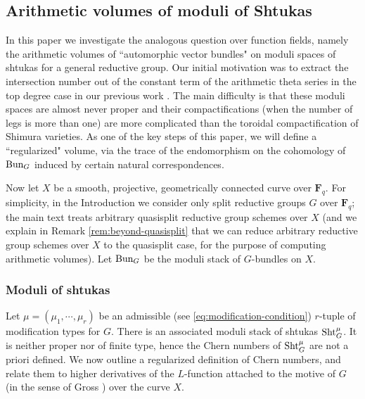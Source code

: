 \documentclass[reqno]{amsart}
\numberwithin{equation}{subsection}
\theoremstyle{definition}
\newcommand{\Bun}{\textup{Bun}}
\newcommand\Sht{\textup{Sht}}
\newcommand{\F}{\mathbf{F}}
\begin{document}
\subsection{Arithmetic volumes of moduli of Shtukas}


In this paper we investigate the analogous question over function fields, namely the arithmetic volumes of ``automorphic vector bundles" on moduli spaces of shtukas for a general reductive group. Our initial motivation was to extract the intersection number out of the constant term of the arithmetic theta series in  the top degree case in our previous work \cite{FYZ2}. The main difficulty is that these moduli spaces are almost never proper and their compactifications (when the number of legs is more than one) are more complicated than the toroidal compactification of Shimura varieties. As one of the key steps of this paper, we will define a ``regularized" volume, via the trace of the endomorphism on the cohomology of $\Bun_G$ induced by certain natural correspondences.

Now let $X$ be a smooth, projective, geometrically connected curve over $\F_q$. For simplicity, in the Introduction we consider only split reductive groups $G$ over $\F_q$; the main text treats arbitrary quasisplit reductive group schemes over $X$ (and we explain in Remark \ref{rem:beyond-quasisplit} that we can reduce arbitrary reductive group schemes over $X$ to the quasisplit case, for the purpose of computing arithmetic volumes). Let $\Bun_G$ be the moduli stack of $G$-bundles on $X$. 
 
\subsubsection{Moduli of shtukas} 
Let $\mu=(\mu_{1},\cdots ,\mu_{r})$ be an admissible (see \eqref{eq:modification-condition}) $r$-tuple of modification types for $G$. There is an associated moduli stack of shtukas $\Sht_{G}^{\mu}$. It is neither proper nor of finite type, hence the Chern numbers of $\Sht^{\mu}_{G}$ are not a priori defined. We now outline a regularized definition of Chern numbers, and relate them to higher derivatives of the $L$-function attached to the motive of $G$ (in the sense of Gross \cite{Gro97}) over the curve $X$.
\end{document}

